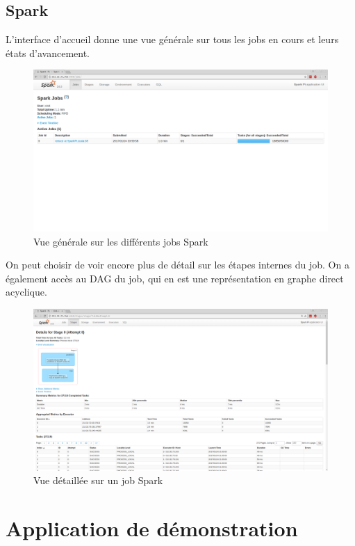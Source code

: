 \documentclass[a4paper, 11pt, titlepage]{article}
\begin{document}
\subsection{Spark}
L'interface d'accueil donne une vue générale sur tous les jobs en cours et leurs états d'avancement.
\begin{figure}[H]
    \centering
    \centerline{\includegraphics[scale=0.23]{res/sphome.png}}
    \caption{Vue générale sur les différents jobs Spark}
\end{figure}
On peut choisir de voir encore plus de détail sur les étapes internes du job. On a également accès au DAG du job, qui en est une représentation en graphe direct acyclique.
\begin{figure}[H]
    \centering
    \centerline{\includegraphics[scale=0.23]{res/jobdetails.png}}
    \caption{Vue détaillée sur un job Spark}
\end{figure}


\newpage

\section {Application de démonstration}
\end{document}
